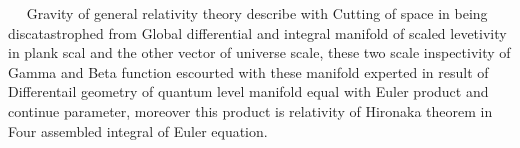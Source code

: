 \documentclass{jsarticle}
\begin{document}
  　 Gravity of general relativity theory describe with Cutting of space
in being discatastrophed from Global differential and integral manifold
of scaled levetivity in plank scal and the other vector of universe
scale, these two scale inspectivity of Gamma and Beta function escourted
with these manifold experted in result of Differentail geometry of
quantum level manifold equal with Euler product and continue parameter,
moreover this product is relativity of Hironaka theorem in Four assembled
integral of Euler equation.

   \newcommand{\variint}{%
	\begin{picture}(15,30)
		\put(0,0){
			$ \iint $}
		\put(0,5){\line(15,0){15}}
	\end{picture} %
}

\newcommand{\variiint}{%
	\begin{picture}(15,15)
		\put(0,0){
			$ \iiint $}
		\put(0,5){\line(15,0){20}}
	\end{picture} %
}



 \newcommand{\alearletter}{%
	 \begin{picture}(10,20)
		 \put(0,0){
			 $ \square $}
		 \put(0,0){\line(1,1){10}}
	 \end{picture} %
	 }
\end{document}
